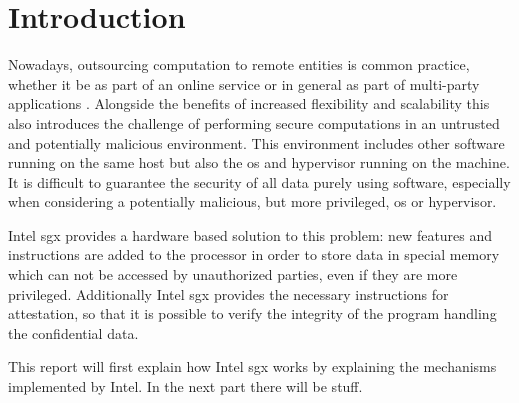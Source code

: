 \section{Introduction} \label{sec:introduction}
Nowadays, outsourcing computation to remote entities is common practice, whether it be as part of an online service or 
in general as part of multi-party applications \cite{UseOfIntelSGX}. 
Alongside the benefits of increased flexibility and scalability this also introduces the challenge of performing secure 
computations in an untrusted and potentially malicious environment. 
This environment includes other software running on the same host but also the \ac{os} and hypervisor running
on the machine.
It is difficult to guarantee the security of all data purely using software, especially when considering a potentially 
malicious, but more privileged, \ac{os} or hypervisor.

Intel \ac{sgx} provides a hardware based solution to this problem: new features and instructions are added to the processor
in order to store data in special memory which can not be accessed by unauthorized parties, even if they are more
privileged. Additionally Intel \ac{sgx} provides the necessary instructions for attestation, so that it is possible to
verify the integrity of the program handling the confidential data.

This report will first explain how Intel \ac{sgx} works by explaining the mechanisms implemented by Intel. In the next
part there will be stuff.

